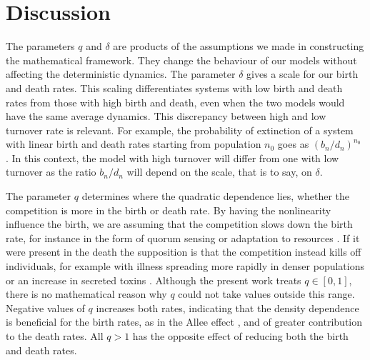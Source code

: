 \section{Discussion}

The parameters $q$ and $\delta$ are products of the assumptions we made in constructing the mathematical framework.
They change the behaviour of our models without affecting the deterministic dynamics.
The parameter $\delta$ gives a scale for our birth and death rates.
This scaling differentiates systems with low birth and death rates from those with high birth and death, even when the two models would have the same average dynamics.
This discrepancy between high and low turnover rate is relevant. 
For example, the probability of extinction of a system with linear birth and death rates starting from population $n_0$ goes as $(b_n/d_n)^{n_0}$ \cite{Nisbet1982}. 
In this context, the model with high turnover will differ from one with low turnover as the ratio $b_n/d_n$ will depend on the scale, that is to say, on $\delta$.

The parameter $q$ determines where the quadratic dependence lies, whether the competition is more in the birth or death rate.
By having the nonlinearity influence the birth, we are assuming that the competition slows down the birth rate, for instance in the form of quorum sensing \cite{Nadell2008} or adaptation to resources \cite{Vulic2001}. %
If it were present in the death the supposition is that the competition instead kills off individuals, for example with illness spreading more rapidly in denser populations \cite{Greenhalgh1990} or an increase in secreted toxins \cite{VanMelderen2009,Rankin2012}.
Although the present work treats $q \in [0,1]$, there is no mathematical reason why $q$ could not take values outside this range.
Negative values of $q$ increases both rates, indicating that the density dependence is beneficial for the birth rates, as in the Allee effect \cite{Chesson2000,Assaf2016}, and of greater contribution to the death rates.
All $q>1$ has the opposite effect of reducing both the birth and death rates. %

